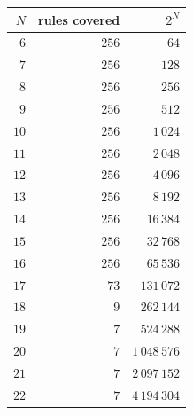 \begin{tabular}{rrr}
\hline
$N$ & rules covered & $2^N$ \\
\hline
$6$ & $256$ & $64$ \\
$7$ & $256$ & $128$ \\
$8$ & $256$ & $256$ \\
$9$ & $256$ & $512$ \\
$10$ & $256$ & $1\,024$ \\
$11$ & $256$ & $2\,048$ \\
$12$ & $256$ & $4\,096$ \\
$13$ & $256$ & $8\,192$ \\
$14$ & $256$ & $16\,384$ \\
$15$ & $256$ & $32\,768$ \\
$16$ & $256$ & $65\,536$ \\
$17$ & $73$ & $131\,072$ \\
$18$ & $9$ & $262\,144$ \\
$19$ & $7$ & $524\,288$ \\
$20$ & $7$ & $1\,048\,576$ \\
$21$ & $7$ & $2\,097\,152$ \\
$22$ & $7$ & $4\,194\,304$ \\
\hline
\end{tabular}
